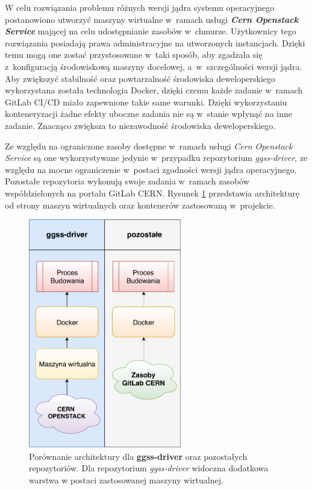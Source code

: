W celu rozwiązania problemu różnych wersji jądra systemu operacyjnego postanowiono utworzyć maszyny wirtualne w~ramach usługi \textit{\textbf{Cern Openstack Service}} mającej na celu udostępnianie zasobów w~chmurze. Użytkownicy tego rozwiązania posiadają prawa administracyjne na utworzonych instancjach. Dzięki temu mogą one zostać przystosowane w~taki sposób, aby zgadzała się z~konfiguracją środowiskową maszyny docelowej, a~w~szczególności wersji jądra. Aby zwiększyć stabilność oraz powtarzalność środowiska deweloperskiego wykorzystana została technologia Docker, dzięki czemu każde zadanie w~ramach GitLab CI/CD miało zapewnione takie same warunki. Dzięki wykorzystaniu konteneryzacji żadne efekty uboczne zadania nie są w~stanie wpłynąć na inne zadanie. Znacząco zwiększa to niezawodność środowiska deweloperskiego.

Ze względu na ograniczone zasoby dostępne w~ramach usługi \textit{Cern Openstack Service} są one wykorzystywane jedynie w~przypadku repozytorium \textit{ggss-driver}, ze względu na mocne ograniczenie w~postaci zgodności wersji jądra operacyjnego. Pozostałe repozytoria wykonują swoje zadania w~ramach zasobów współdzielonych na portalu GitLab CERN. Rysunek \ref{fig:buildComp} przedstawia architekturę od strony maszyn wirtualnych oraz kontenerów zastosowaną w~projekcie.

\newpage

\begin{figure}[H]
\centering
\includegraphics[width=0.6\textwidth]{res/buildComp}
\caption{Porównanie architektury dla \textbf{ggss-driver} oraz pozostałych repozytoriów. Dla repozytorium \textit{ggss-driver} widoczna dodatkowa warstwa w postaci zastosowanej maszyny wirtualnej.}
\label{fig:buildComp}
\end{figure}

